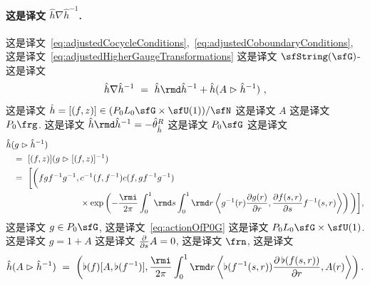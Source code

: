 \documentclass[
    affil-it, %
    auth-lg, %
    british, %
    compression, %
    contents, %
    custom-packages={}, %
    references={bigone}, %
]{lib/preprint}
\newcommand{\boundary}{\flat}
\begin{document}
\begin{body}
        \paragraph{这是译文 $\hat h\nabla\hat h^{-1}$.}  这是译文~\eqref{eq:adjustedCocycleConditions},~\eqref{eq:adjustedCoboundaryConditions}, 这是译文~\eqref{eq:adjustedHigherGaugeTransformations} 这是译文 $ \sfString(\sfG) $-这是译文         \begin{equation}
            \hat h\nabla\hat h^{-1}\ =\ \hat h\rmd\hat h^{-1}+ \hat h(A\acton\hat h^{-1})~,
        \end{equation}  这是译文 $\hat h=[(f,z)]\in (P_0L_0\sfG\times\sfU(1))/\sfN$ 这是译文 $A$ 这是译文 $P_0\frg$. 这是译文 $\hat h\rmd\hat h^{-1}=-\hat \theta^R_{\hat h}$ 这是译文 $P_0\sfG$ 这是译文         \begin{equation}
            \begin{aligned}
                &\hat h(g\acton\hat h^{-1})
                \\
                &\kern5pt\ =\  [(f,z)](g\acton[(f,z)]^{-1})
                \\
                &\kern5pt\ =\ \bigg[\bigg(fgf^{-1}g^{-1},c^{-1}(f,f^{-1})c(f,gf^{-1}g^{-1})
                \\
                &\kern3cm\times\exp\left(-\frac{\rmi}{2\pi}\int_0^1\rmd s\int_0^1\rmd r\innerLarge{g^{-1}(r)\parder[g(r)]{r}}{\parder[f(s,r)]{s}f^{-1}(s,r)}\right)\bigg)\bigg],
            \end{aligned}
        \end{equation}  这是译文 $g\in P_0\sfG$, 这是译文~\eqref{eq:actionOfP0G} 这是译文 $P_0L_0\sfG\times \sfU(1)$. 这是译文 $ g=1+A $ 这是译文 $\parder{s}A=0$, 这是译文 $\frn$, 这是译文         \begin{equation}\label{eq:hAhinv}
            \hat h (A\acton\hat h^{-1})\ =\ \left(\boundary(f)[A,\boundary(f^{-1})],\frac{\rmi}{2\pi}\int_0^1\rmd r\innerLarge{\boundary(f^{-1}(s,r))\parder[\,\boundary(f(s,r))]{r}}{A(r)}\right).
        \end{equation}

    \end{body}
\end{document}
